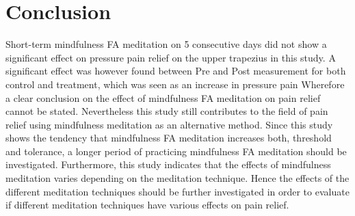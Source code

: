 \section{Conclusion}
Short-term mindfulness FA meditation on 5 consecutive days did not show a significant effect on pressure pain relief on the upper trapezius in this study. A significant effect was however found between Pre and Post measurement for both control and treatment, which was seen as an increase in pressure pain
Wherefore a clear conclusion on the effect of mindfulness FA meditation on pain relief cannot be stated. Nevertheless this study still contributes to the field of pain relief using mindfulness meditation as an alternative method. Since this study shows the tendency that mindfulness FA meditation increases both, threshold and tolerance, a longer period of practicing mindfulness FA meditation should be investigated. Furthermore, this study indicates that the effects of mindfulness meditation varies depending on the meditation technique. Hence the effects of the different meditation techniques should be further investigated in order to evaluate if different meditation techniques have various effects on pain relief. 